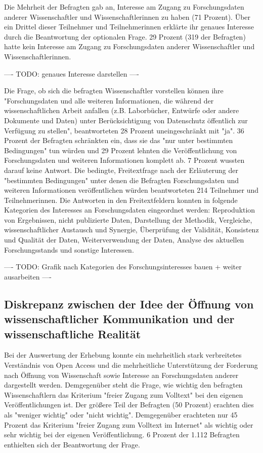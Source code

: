 Die Mehrheit der Befragten gab an, Interesse am Zugang zu Forschungsdaten anderer Wissenschaftler und Wissenschaftlerinnen zu haben (71 Prozent). Über ein Drittel dieser Teilnehmer und Teilnehmerinnen erklärte ihr genaues Interesse durch die Beantwortung der optionalen Frage. 29 Prozent (319 der Befragten) hatte kein Interesse am Zugang zu Forschungsdaten anderer Wissenschaftler und Wissenschaftlerinnen.

---- TODO: genaues Interesse darstellen ----

Die Frage, ob sich die befragten Wissenschaftler vorstellen können ihre "Forschungsdaten und alle weiteren Informationen, die während der wissenschaftlichen Arbeit anfallen (z.B. Laborbücher, Entwürfe oder andere Dokumente und Daten) unter Berücksichtigung von Datenschutz öffentlich zur Verfügung zu stellen", beantworteten 28 Prozent uneingeschränkt mit "ja". 36 Prozent der Befragten schränkten ein, dass sie das "nur unter bestimmten Bedingungen" tun würden und 29 Prozent lehnten die Veröffentlichung von Forschungsdaten und weiteren Informationen komplett ab. 7 Prozent wussten darauf keine Antwort. Die bedingte, Freitextfrage nach der Erläuterung der "bestimmten Bedingungen" unter denen die Befragten Forschungsdaten und weiteren Informationen veröffentlichen würden beantworteten 214 Teilnehmer und Teilnehmerinnen. Die Antworten in den Freitextfeldern konnten in folgende Kategorien des Interesses an Forschungsdaten eingeordnet werden: Reproduktion von Ergebnissen, nicht publizierte Daten, Darstellung der Methodik, Vergleiche, wissenschaftlicher Austausch und Synergie, Überprüfung der Validität, Konsistenz und Qualität der Daten, Weiterverwendung der Daten, Analyse des aktuellen Forschungsstands und sonstige Interessen.

---- TODO: Grafik nach Kategorien des Forschungsinteresses bauen + weiter ausarbeiten ----

\subsection{Diskrepanz zwischen der Idee der Öffnung von wissenschaftlicher Kommunikation und der wissenschaftliche Realität}

 Bei der Auswertung der Erhebung konnte ein mehrheitlich stark verbreitetes Verständnis von Open Access und die mehrheitliche Unterstützung der Forderung nach Öffnung von Wissenschaft sowie Interesse an Forschungsdaten anderer dargestellt werden. Demgegenüber steht die Frage, wie wichtig den befragten Wissenschaftlern das Kriterium "freier Zugang zum Volltext" bei den eigenen Veröffentlichungen ist. Der größere Teil der Befragten (50 Prozent) erachten dies als "weniger wichtig" oder "nicht wichtig". Demgegenüber erachteten nur 45 Prozent das Kriterium "freier Zugang zum Volltext im Internet" als wichtig oder sehr wichtig bei der eigenen Veröffentlichung. 6 Prozent der 1.112 Befragten enthielten sich der Beantwortung der Frage.

